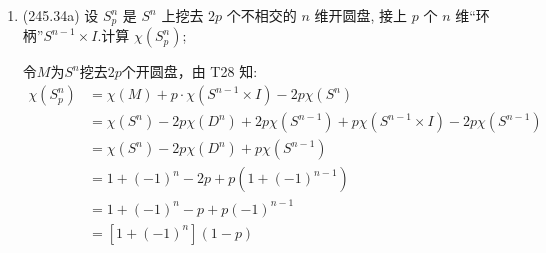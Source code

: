 \begin{enumerate}
\begin{proofc}
从而 $\chi(K_1 \cup K_2) = \chi(K_1) + \chi(K_2) - \chi(K_1 \cap K_2)$    
    
    \end{proofc}
    
    \item (245.34a) 设 $S_p^n$ 是 $S^n$ 上挖去 $2p$ 个不相交的 $n$ 维开圆盘, 接上 $p$ 个 $n$ 维“环柄”$S^{n-1} \times I$.计算 $\chi(S_p^n)$;
    \begin{proofc}
        令$M$为$S^n$挖去$2p$个开圆盘，由 T28 知: 
        \begin{align*}
        \chi(S_p^n) &= \chi(M) + p \cdot \chi(S^{n-1} \times I) - 2p \chi(S^n)\\
        &= \chi(S^n) - 2p \chi(D^n) + 2p \chi(S^{n-1}) + p \chi(S^{n-1} \times I)-2p\chi(S^{n-1})\\
        &= \chi(S^n) - 2p \chi(D^n) + p \chi(S^{n-1}) \\
        &= 1 + (-1)^n - 2p + p(1 + (-1)^{n-1})\\
        &= 1 + (-1)^n - p + p(-1)^{n-1}\\
        &= [1 + (-1)^n] (1 - p)\\
    \end{align*}
    \end{proofc}

\end{enumerate}



